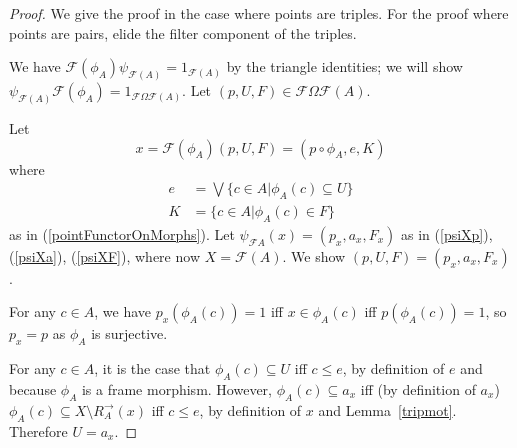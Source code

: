 \documentclass[10pt,a4paper]{amsart}
\newcommand{\Fcal}{\mathcal{F}} %
\newcommand{\dirim}{^{\rightarrow\!}}
\newcommand{\interiorop}[1]{{#1}^\circ}
\begin{document}
\begin{proof}
We give the proof in the case where points are triples. For the proof where points are pairs, elide the filter component of the triples.

We have 
$\mathcal{F}(\phi _A) \psi _{ \mathcal{F}(A)} = 1 _{\mathcal{F}(A)}$ 
by the triangle identities; we will show 
$\psi _{ \mathcal{F}(A) } \mathcal{F} (\phi _A) = 1 _{\mathcal{F}\Omega\mathcal{F}(A)}$.
Let $(p, U , F ) \in \mathcal{F} 
\Omega \mathcal{F} (A)$.

Let
\begin{equation*}
x = \mathcal{F}(\phi _A)(p, U, F ) 
 =  (p \circ \phi _A, e , K ) 
\end{equation*}
where 
\begin{align*}
    e &= \bigvee \{ c \in A | \phi _A (c) \subseteq U\} \\
    K &= \{ c \in A | \phi _A (c) \in F \} 
\end{align*}
as in (\ref{pointFunctorOnMorphs}).
Let $\psi _{\mathcal{F} A} (x) = (p_x , a_x , F_x)$ as in (\ref{psiXp}), (\ref{psiXa}), (\ref{psiXF}), where now $X = \Fcal(A)$.
We show $(p,U,F) = (p_x , a_x , F_x)$. %

For any $c \in A$, we have $p_x ( \phi _A (c))=1$ iff $x \in \phi _A(c)$ iff 
$p ( \phi _A (c))=1$, so $p_x = p$ as $\phi_A$ is surjective.

For any $c \in A$, it is the case that $\phi _A (c) \subseteq U$ iff 
$c \leq e$, by definition of $e$ and because $\phi_A$ is a frame morphism. 
However, 
$\phi _A(c) \subseteq a_x$ 
iff (by definition of $a_x$)
$\phi _A (c) \subseteq  X \setminus R_A\dirim (x)$ 
iff $c \leq e$, by definition of $x$ and Lemma~\ref{tripmot}.
Therefore $U = a_x$. 


\end{proof}
\end{document}

